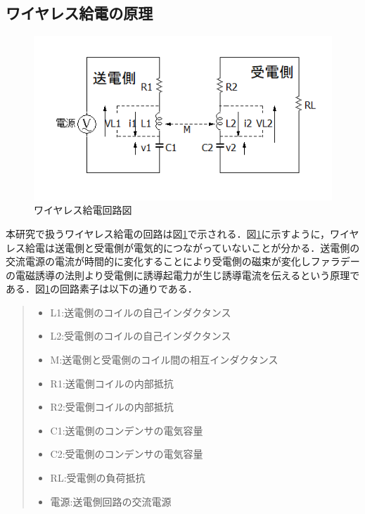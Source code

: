 \documentclass[12pt]{jarticle}
\begin{document}
\subsection{ワイヤレス給電の原理}
\begin{figure}[h]
	\centering
	\includegraphics[]{wpt_2020128.png}
	\caption{ワイヤレス給電回路図}
	\label{fig:wpt_kairo}
\end{figure}
本研究で扱うワイヤレス給電の回路は図\ref{fig:wpt_kairo}で示される．図\ref{fig:wpt_kairo}に示すように，ワイヤレス給電は送電側と受電側が電気的につながっていないことが分かる．送電側の交流電源の電流が時間的に変化することにより受電側の磁束が変化しファラデーの電磁誘導の法則より受電側に誘導起電力が生じ誘導電流を伝えるという原理である．図\ref{fig:wpt_kairo}の回路素子は以下の通りである．
\begin{quote}
	\begin{itemize}
		\item L1:送電側のコイルの自己インダクタンス
		\item L2:受電側のコイルの自己インダクタンス
		\item M:送電側と受電側のコイル間の相互インダクタンス
		\item R1:送電側コイルの内部抵抗
		\item R2:受電側コイルの内部抵抗
		\item C1:送電側のコンデンサの電気容量
		\item C2:受電側のコンデンサの電気容量
		\item RL:受電側の負荷抵抗
		\item 電源:送電側回路の交流電源
	\end{itemize}
\end{quote}
\clearpage
\end{document}
